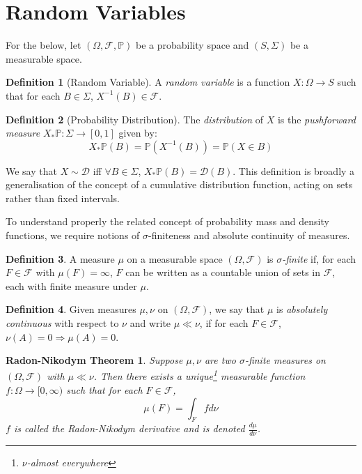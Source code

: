 \documentclass[a4paper,11pt,oneside]{book}
\theoremstyle{plain}
\newtheorem*{rnt}{Radon-Nikodym Theorem}
\theoremstyle{definition}
\newtheorem{defn}{Definition}[section]
\begin{document}
\section{Random Variables}
For the below, let $(\Omega,\mathcal{F},\mathbb{P})$ be a probability space and $(S, \Sigma)$ be a measurable space.
\begin{defn}[Random Variable]
A \emph{random variable} is a function $X:\Omega \rightarrow S$ such that for each $B\in \Sigma$, $X^{-1}(B) \in \mathcal{F}$.
\end{defn}
\begin{defn}[Probability Distribution]
The \emph{distribution} of $X$ is the \emph{pushforward measure} $X_*\mathbb{P}:\Sigma\rightarrow [0,1]$ given by: \[X_*\mathbb{P}(B)=\mathbb{P}(X^{-1}(B))=\mathbb{P}(X \in B)\]
\end{defn}
We say that $X \sim \mathcal{D}$ iff $\forall B \in \Sigma$, $X_*\mathbb{P}(B)=\mathcal{D}(B)$.
This definition is broadly a generalisation of the concept of a cumulative distribution function, acting on sets rather than fixed intervals.
\par
To understand properly the related concept of probability mass and density functions, we require notions of $\sigma$-finiteness and absolute continuity of measures.
\begin{defn}
A measure $\mu$ on a measurable space $(\Omega, \mathcal{F})$ is $\sigma$\emph{-finite} if, for each $F \in \mathcal{F}$ with $\mu (F)=\infty$, $F$ can be written as a countable union of sets in $\mathcal{F}$, each with finite measure under $\mu$.
\end{defn}
\begin{defn}
Given measures $\mu ,\nu$ on $(\Omega, \mathcal{F})$, we say that $\mu$ is \emph{absolutely continuous} with respect to $\nu$ and write $\mu\ll \nu$, if for each $F\in \mathcal{F}$, $\nu (A)=0 \Rightarrow \mu (A)=0$.
\end{defn}
\begin{rnt}
Suppose $\mu, \nu$ are two $\sigma$-finite measures on $(\Omega, \mathcal{F})$ with $\mu\ll \nu$. Then there exists a unique\footnote{$\nu$-almost everywhere} measurable function $f:\Omega \rightarrow [0,\infty)$ such that for each $F \in \mathcal{F}$, \[\mu (F) =\int_F f d\nu\] $f$ is called the Radon-Nikodym derivative and is denoted $\frac{d\mu}{d\nu}$.
\end{rnt}
\end{document}
